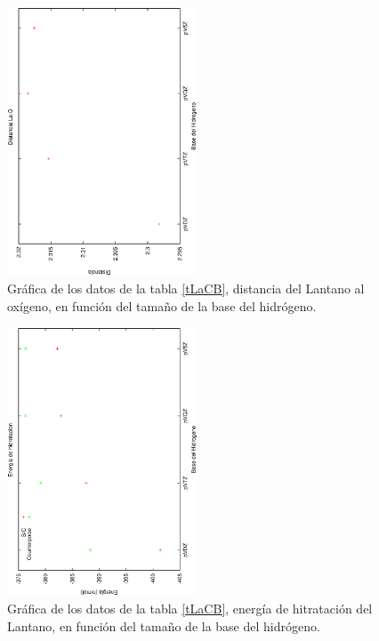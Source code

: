 \begin{figure}[h]
\centering
\includegraphics[height=8cm,angle=-90]{../Tablas/laCBdist.ps}
\caption{\small{Gr\'afica de los datos de la tabla \ref{tLaCB},
distancia del Lantano al ox\'igeno, en funci\'on del tama\~no
de la base del hidr\'ogeno.}}
\label{fLaCBD}
\end{figure}
\begin{figure}[h]
\centering
\includegraphics[height=8cm,angle=-90]{../Tablas/laCBeneh.ps}
\caption{\small{Gr\'afica de los datos de la tabla \ref{tLaCB},
energ\'ia de hitrataci\'on del Lantano, en funci\'on del tama\~no
de la base del hidr\'ogeno.}}
\label{fLaCBE}
\end{figure}

